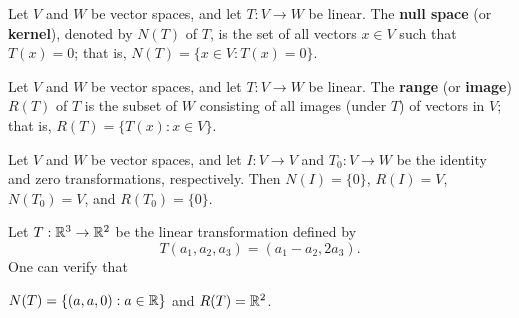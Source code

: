 \begin{definition}\label{Null Spaces}
    Let \( V  \) and \( W  \) be vector spaces, and let \( T: V \to W  \) be linear. 
   The \textbf{null space} (or \textbf{kernel}), denoted by \( N(T) \) of \( T  \), is the set of all vectors \( x \in V  \) such that \( T(x) = 0  \); that is, \( N(T) = \{ x \in V : T(x) = 0  \}  \). 
\end{definition}

\begin{definition}[Range]\label{Range}
    Let \( V  \) and \( W  \) be vector spaces, and let \( T: V \to W  \) be linear. 
   The \textbf{range} (or \textbf{image}) \( R(T)  \) of \( T  \) is the subset of \( W  \) consisting of all images (under \( T \)) of vectors in \( V  \); that is, \( R(T) = \{ T(x) : x \in V  \}  \).
\end{definition}

\begin{eg}
    Let \( V  \) and \( W  \) be vector spaces, and let \( I: V \to V  \) and \( T_{0}: V \to W  \) be the identity and zero transformations, respectively. Then \( N(I) = \{ 0  \}  \), \( R(I) = V  \), \( N(T_{0}) = V  \), and \( R(T_{0}) = \{ 0 \}  \).
\end{eg}


\begin{eg}
    Let \( T: \mathbb{R}^{3} \to \mathbb{R}^{2}  \) be the linear transformation defined by  
    \[  T(a_{1}, a_{2}, a_{3}) = (a_{1} - a_{2}, 2a_{3} ). \]
    One can verify that 
    \begin{center}
        \( N(T) = \{ (a,a,0) : a \in \mathbb{R}  \}  \) and \( R(T) = \mathbb{R}^{2} \).
    \end{center}
\end{eg}


